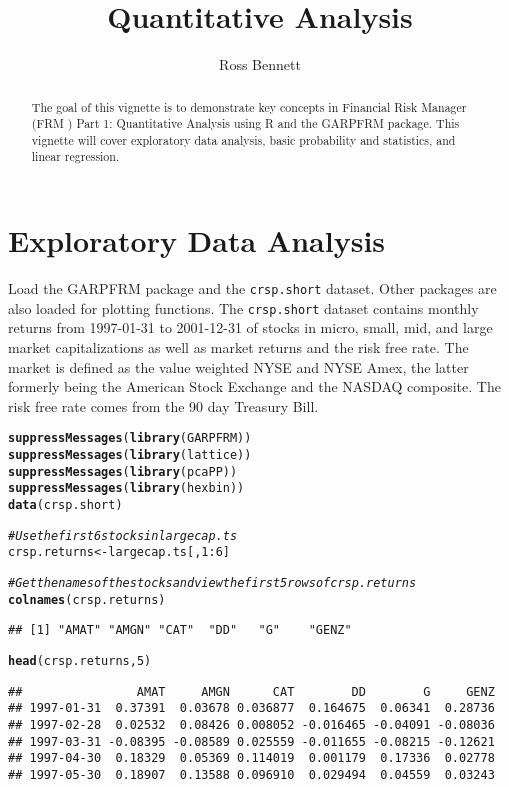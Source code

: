 \documentclass[a4paper]{article}\usepackage[]{graphicx}\usepackage[]{color}
\makeatletter
\newcommand{\hlcom}[1]{\textcolor[rgb]{0.678,0.584,0.686}{\textit{#1}}}%
\newcommand{\hlkwd}[1]{\textcolor[rgb]{0.737,0.353,0.396}{\textbf{#1}}}%
\newenvironment{kframe}{%
 \def\at@end@of@kframe{}%
 \ifinner\ifhmode%
  \def\at@end@of@kframe{\end{minipage}}%
  \begin{minipage}{\columnwidth}%
 \fi\fi%
 \def\FrameCommand##1{\hskip\@totalleftmargin \hskip-\fboxsep
 \colorbox{shadecolor}{##1}\hskip-\fboxsep
     \hskip-\linewidth \hskip-\@totalleftmargin \hskip\columnwidth}%
 \MakeFramed {\advance\hsize-\width
   \@totalleftmargin\z@ \linewidth\hsize
   \@setminipage}}%
 {\par\unskip\endMakeFramed%
 \at@end@of@kframe}
\newenvironment{knitrout}{}{} %
\makeatother
\begin{document}
\title{Quantitative Analysis}
\author{Ross Bennett}

\maketitle

\begin{abstract}
The goal of this vignette is to demonstrate key concepts in Financial Risk Manager (FRM \textsuperscript{\textregistered}) Part 1: Quantitative Analysis using R and the GARPFRM package. This vignette will cover exploratory data analysis, basic probability and statistics, and linear regression.
\end{abstract}

\tableofcontents

\section{Exploratory Data Analysis}

Load the GARPFRM package and the \verb"crsp.short" dataset. Other packages are also loaded for plotting functions. The \verb"crsp.short" dataset contains monthly returns from 1997-01-31 to 2001-12-31 of stocks in micro, small, mid, and large market capitalizations as well as market returns and the risk free rate. The market is defined as the value weighted NYSE and NYSE Amex, the latter formerly being the American Stock Exchange and the NASDAQ composite. The risk free rate comes from the 90 day Treasury Bill.
\begin{knitrout}
\color{fgcolor}\begin{kframe}
\begin{alltt}
\hlkwd{suppressMessages}(\hlkwd{library}(GARPFRM))
\hlkwd{suppressMessages}(\hlkwd{library}(lattice))
\hlkwd{suppressMessages}(\hlkwd{library}(pcaPP))
\hlkwd{suppressMessages}(\hlkwd{library}(hexbin))
\hlkwd{data}(crsp.short)

\hlcom{# Use the first 6 stocks in largecap.ts}
crsp.returns <- largecap.ts[, 1:6]

\hlcom{# Get the names of the stocks and view the first 5 rows of crsp.returns}
\hlkwd{colnames}(crsp.returns)
\end{alltt}
\begin{verbatim}
## [1] "AMAT" "AMGN" "CAT"  "DD"   "G"    "GENZ"
\end{verbatim}
\begin{alltt}
\hlkwd{head}(crsp.returns, 5)
\end{alltt}
\begin{verbatim}
##                AMAT     AMGN      CAT        DD        G     GENZ
## 1997-01-31  0.37391  0.03678 0.036877  0.164675  0.06341  0.28736
## 1997-02-28  0.02532  0.08426 0.008052 -0.016465 -0.04091 -0.08036
## 1997-03-31 -0.08395 -0.08589 0.025559 -0.011655 -0.08215 -0.12621
## 1997-04-30  0.18329  0.05369 0.114019  0.001179  0.17336  0.02778
## 1997-05-30  0.18907  0.13588 0.096910  0.029494  0.04559  0.03243
\end{verbatim}
\end{kframe}
\end{knitrout}
\end{document}
